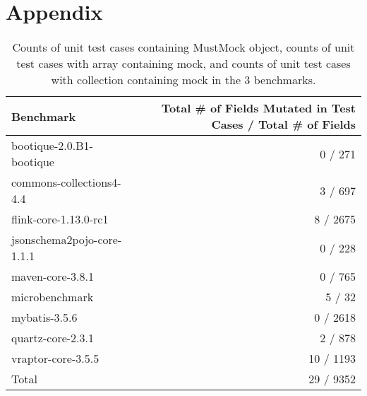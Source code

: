 \section*{Appendix}
\label{sec:appendix}

\begin{table*}[b]
	\centering
	\caption{Counts of unit test cases containing MustMock object, counts of unit test cases with array containing mock, and counts of unit test cases with collection containing mock in the 3 benchmarks.}
	\begin{tabular}{lr}
		\toprule
		Benchmark &  Total \# of Fields Mutated in Test Cases / Total \# of Fields \\
		\midrule
		bootique-2.0.B1-bootique           			&  0 / 271       \\
		commons-collections4-4.4           			&  3 / 697       \\
		flink-core-1.13.0-rc1           			&  8 / 2675       \\
		jsonschema2pojo-core-1.1.1           		&  0 / 228       \\
		maven-core-3.8.1           					&  0 / 765       \\
		microbenchmark           					&  5 / 32       \\
		mybatis-3.5.6           					&  0 / 2618       \\
		quartz-core-2.3.1           				&  2 / 878       \\
		vraptor-core-3.5.5           				&  10 / 1193       \\
		\bottomrule
		Total           				&  29 / 9352       \\
	\end{tabular}
	\label{tab:mocks}
\end{table*}
